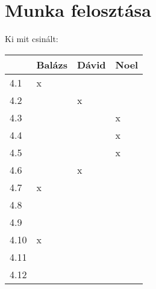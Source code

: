 \section{Munka felosztása}\label{sec:munka-felosztasa}

Ki mit csinált:


\begin{tabular}{ |p{3cm}|p{3cm}|p{3cm}|p{3cm}|  }
    \hline
    &Balázs & Dávid & Noel \\
    \hline
    4.1&x&& \\
    \hline
    4.2&&x& \\
    \hline
    4.3&&&x \\
    \hline
    4.4&&&x \\
    \hline
    4.5&&&x \\
    \hline
    4.6&&x& \\
    \hline
    4.7&x&& \\
    \hline
    4.8&&& \\
    \hline
    4.9&&& \\
    \hline
    4.10&x&& \\
    \hline
    4.11&&& \\
    \hline
    4.12&&& \\
    \hline
\end{tabular}
